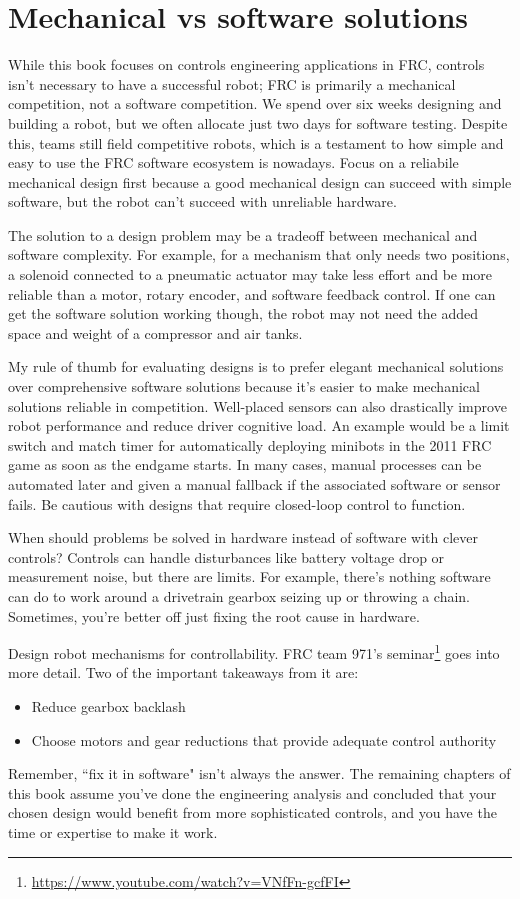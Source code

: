 \section{Mechanical vs software solutions}

While this book focuses on controls engineering applications in FRC, controls
isn't necessary to have a successful robot; FRC is primarily a mechanical
competition, not a software competition. We spend over six weeks designing and
building a robot, but we often allocate just two days for software testing.
Despite this, teams still field competitive robots, which is a testament to how
simple and easy to use the FRC software ecosystem is nowadays. Focus on a
reliabile mechanical design first because a good mechanical design can succeed
with simple software, but the robot can't succeed with unreliable hardware.

The solution to a design problem may be a tradeoff between mechanical and
software complexity. For example, for a mechanism that only needs two positions,
a solenoid connected to a pneumatic actuator may take less effort and be more
reliable than a motor, rotary encoder, and software feedback control. If one can
get the software solution working though, the robot may not need the added space
and weight of a compressor and air tanks.

My rule of thumb for evaluating designs is to prefer elegant mechanical
solutions over comprehensive software solutions because it's easier to make
mechanical solutions reliable in competition. Well-placed sensors can also
drastically improve robot performance and reduce driver cognitive load. An
example would be a limit switch and match timer for automatically deploying
minibots in the 2011 FRC game as soon as the endgame starts. In many cases,
manual processes can be automated later and given a manual fallback if the
associated software or sensor fails. Be cautious with designs that require
closed-loop control to function.

When should problems be solved in hardware instead of software with clever
controls? Controls can handle disturbances like battery voltage drop or
measurement noise, but there are limits. For example, there's nothing software
can do to work around a drivetrain gearbox seizing up or throwing a chain.
Sometimes, you're better off just fixing the root cause in hardware.

Design robot mechanisms for controllability. FRC team 971's
seminar\footnote{\url{https://www.youtube.com/watch?v=VNfFn-gcfFI}} goes into
more detail. Two of the important takeaways from it are:
\begin{itemize}
  \item Reduce gearbox backlash
  \item Choose motors and gear reductions that provide adequate control
        authority
\end{itemize}

Remember, ``fix it in software" isn't always the answer. The remaining chapters
of this book assume you've done the engineering analysis and concluded that your
chosen design would benefit from more sophisticated controls, and you have the
time or expertise to make it work.

